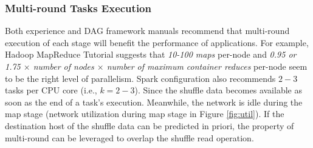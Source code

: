 \subsubsection{Multi-round Tasks Execution}\label{multi}
\ifrevision
{}
\fi
Both experience and DAG framework manuals recommend that multi-round execution of each stage will benefit the performance of applications.
For example, Hadoop MapReduce Tutorial \cite{hadooptutorial} suggests that \textit{10-100 maps} per-node and \textit{0.95 or 1.75 $\times$ number of nodes $\times$ number of maximum container reduces} per-node seem to be the right level of parallelism. 
Spark configuration also recommends $2-3$ tasks per CPU core \cite{sparkconf} (i.e., $k = 2-3$).
Since the shuffle data becomes available as soon as the end of a task's execution. 
Meanwhile, the network is idle during the map stage (network utilization during map stage in Figure \ref{fig:util}). 
If the destination host of the shuffle data can be predicted in priori, the property of multi-round can be leveraged to overlap the shuffle read operation.
\ifrevision
{}
\fi
{}
